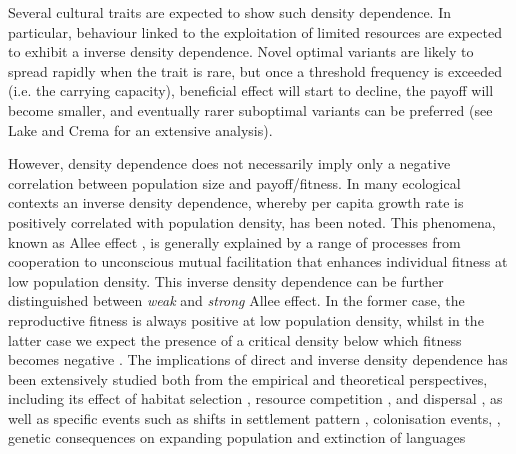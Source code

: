 \documentclass[preprint,authoryear]{elsarticle}
\begin{document}
Several cultural traits are expected to show such density dependence. In particular, behaviour linked to the exploitation of limited resources are expected to exhibit a inverse density dependence. Novel optimal variants are likely to spread rapidly when the trait is rare, but once a threshold frequency is exceeded (i.e. the carrying capacity),  beneficial effect will start to decline, the payoff will become smaller, and eventually rarer suboptimal variants can be preferred (see Lake and Crema \citeyear{lake_and_crema_2012} for an extensive analysis). 

However, density dependence does not necessarily imply only a negative correlation between population size and payoff/fitness. In many ecological contexts an inverse density dependence, whereby per capita growth rate is positively correlated with population density, has been noted. This phenomena, known as Allee effect \citep{allee1958,courchamp_etal_1999}, is generally explained by a range of processes from cooperation to unconscious mutual facilitation that enhances individual fitness at low population density. This inverse density dependence can be further distinguished between \emph{weak} and \emph{strong} Allee effect. In the former case, the reproductive fitness is always positive at low population density, whilst in the latter case we expect the presence of a critical density below which fitness becomes negative \citep{Wang_and_Kot_2001}. The implications of direct and inverse density dependence has been extensively studied both from the empirical and theoretical perspectives, including its effect of habitat selection \citep{greene_and_stamps_2001}, resource competition \citep{jang2013}, and dispersal \citep{steele_2009}, as well as specific events such as shifts in settlement pattern \citep{crema_2014}, colonisation events,  \citep{kennet_etal_2006}, genetic consequences on expanding population \citep{roques_etal_2012} and extinction of languages \citep{sutherland_2003}  
\end{document}
